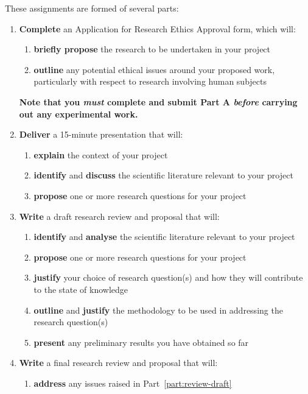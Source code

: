 These assignments are formed of several parts:
\begin{enumerate}[label=(\Alph*)]
	\item \textbf{Complete} an Application for Research Ethics Approval form,
		which will:
		\begin{enumerate}[label=(\roman*)]
			\item \textbf{briefly propose} the research to be undertaken in your project
			\item \textbf{outline} any potential ethical issues around your proposed work,
				particularly with respect to research involving human subjects
		\end{enumerate}
		\textbf{Note that you \textit{must} complete and submit Part A
		\textit{before} carrying out any experimental work.}
	\item \textbf{Deliver} a 15-minute presentation that will:
		\begin{enumerate}[label=(\roman*)]
			\item \textbf{explain} the context of your project
			\item \textbf{identify} and \textbf{discuss} the scientific literature
				relevant to your project
			\item \textbf{propose} one or more research questions for your project
		\end{enumerate}
	\item \label{part:review-draft} \textbf{Write} a draft research review and proposal
		that will:
		\begin{enumerate}[label=(\roman*)]
			\item \textbf{identify} and \textbf{analyse} the scientific literature
				relevant to your project
			\item \textbf{propose} one or more research questions for your project
			\item \textbf{justify} your choice of research question(s)
				and how they will contribute to the state of knowledge
			\item \textbf{outline} and \textbf{justify} the methodology to be used
				in addressing the research question(s)
			\item \textbf{present} any preliminary results you have obtained so far
		\end{enumerate}
	\item \textbf{Write} a final research review and proposal that will:
		\begin{enumerate}[label=(\roman*)]
			\item \textbf{address} any issues raised in Part~\ref{part:review-draft}

\end{enumerate}
\end{enumerate}
